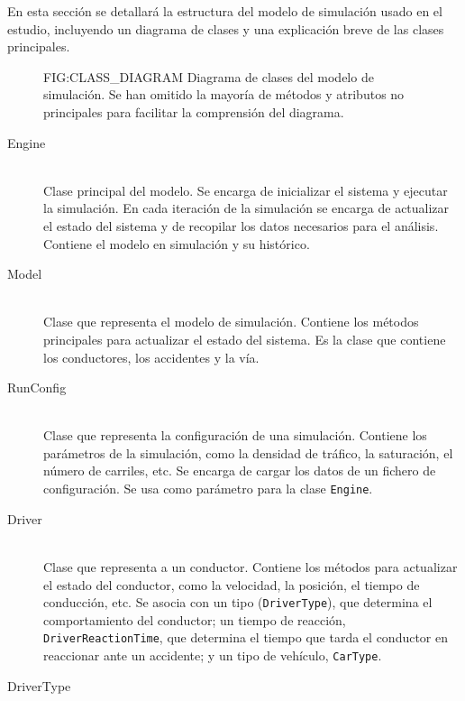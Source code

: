 En esta sección se detallará la estructura del modelo de simulación usado en el estudio, incluyendo un diagrama de clases
y una explicación breve de las clases principales. 

\begin{figure}[Diagrama de clases del modelo]{FIG:CLASS_DIAGRAM}{
    Diagrama de clases del modelo de simulación. Se han omitido la mayoría de métodos y atributos no principales
    para facilitar la comprensión del diagrama.
}
\end{figure}


\begin{description}
    \item[Engine] \hfill \\
        Clase principal del modelo. Se encarga de inicializar el sistema y ejecutar la simulación. En cada iteración de la simulación
        se encarga de actualizar el estado del sistema y de recopilar los datos necesarios para el análisis. Contiene el modelo
        en simulación y su histórico.
    \item[Model] \hfill \\
        Clase que representa el modelo de simulación. Contiene los métodos principales para actualizar el estado del sistema.
        Es la clase que contiene los conductores, los accidentes y la vía.
    \item[RunConfig] \hfill \\
        Clase que representa la configuración de una simulación. Contiene los parámetros de la simulación, como la densidad de tráfico,
        la saturación, el número de carriles, etc. Se encarga de cargar los datos de un fichero de configuración. Se usa como parámetro
        para la clase \texttt{Engine}.
    \item[Driver] \hfill \\
        Clase que representa a un conductor. Contiene los métodos para actualizar el estado del conductor, como la velocidad, la posición,
        el tiempo de conducción, etc. Se asocia con un tipo (\texttt{DriverType}), que determina el comportamiento del conductor;
        un tiempo de reacción, \texttt{DriverReactionTime}, que determina el tiempo que tarda el conductor en reaccionar ante un accidente;
        y un tipo de vehículo, \texttt{CarType}.
    \item[DriverType] \hfill \\

\end{description}
